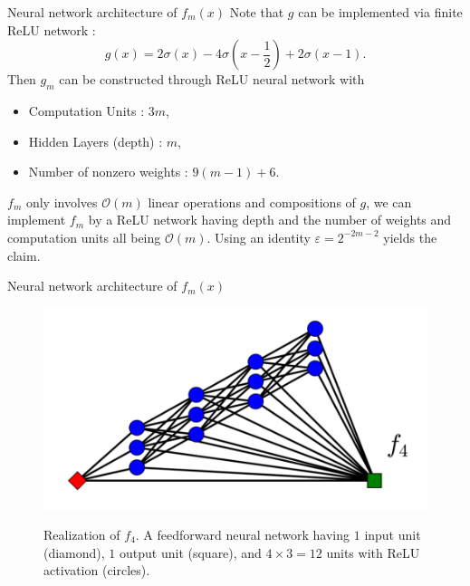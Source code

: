 \documentclass{if-beamer}
\begin{document}
\begin{frame}{Neural network architecture of $f_m(x)$}
Note that $g$ can be implemented via finite ReLU network :
\begin{equation*}
    g(x) = 2\sigma(x) - 4\sigma(x-\frac{1}{2}) +2\sigma(x-1).
\end{equation*}
Then $g_{m}$ can be constructed through ReLU neural network with 
\begin{itemize}
    \item Computation Units : $3m$,
    \item Hidden Layers (depth) : $m$,
    \item Number of nonzero weights : $9(m-1)+6$.
\end{itemize}
$f_m$ only involves $\mathcal{O}(m)$ linear operations and compositions of $g$, we can implement $f_m$ by a ReLU network having depth and the number of weights and computation units all being $\mathcal{O}(m)$. Using an identity $\varepsilon=2^{-2m-2}$ yields the claim.
\end{frame}

\begin{frame}{Neural network architecture of $f_m(x)$}
    \begin{figure}[htbp]
        \includegraphics[width=1\textwidth]{f_4.png}
        \label{fig:figure2}
        \caption{ Realization of $f_{4}$. A feedforward neural network having $1$ input unit (diamond), $1$ output unit  (square), and $4\times 3=12$ units with ReLU activation (circles). }
    \end{figure}
\end{frame}
\end{document}
